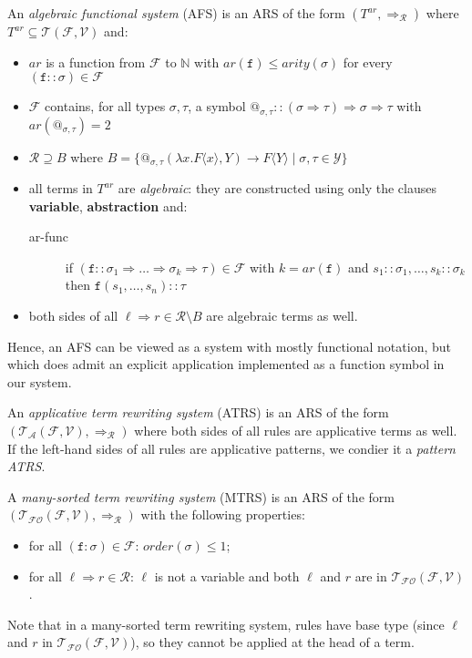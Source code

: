 \documentclass{lmcs}
\theoremstyle{theorem}\newtheorem{theorem}{Theorem}
\theoremstyle{theorem}\newtheorem{lemma}[theorem]{Lemma}
\theoremstyle{theorem}\newtheorem{corollary}[theorem]{Corollary}
\theoremstyle{definition}\newtheorem{definition}[theorem]{Definition}
\theoremstyle{definition}\newtheorem{example}[theorem]{Example}
\newcommand{\N}{\mathbb{N}}
\newcommand{\F}{\mathcal{F}}
\newcommand{\V}{\mathcal{V}}
\newcommand{\Types}{\mathcal{Y}}
\newcommand{\Terms}{\mathcal{T}}
\newcommand{\ATerms}{\mathcal{T}_{\mathcal{A}}}
\newcommand{\FOTerms}{\mathcal{T}_{\mathcal{FO}}}
\newcommand{\Rules}{\mathcal{R}}
\newcommand{\order}{\mathit{order}}
\newcommand{\atype}{\sigma}
\newcommand{\btype}{\tau}
\newcommand{\identifier}[1]{\mathtt{#1}}
\newcommand{\afun}{\identifier{f}}
\newcommand{\avar}{x}
\newcommand{\clause}[1]{\textbf{#1}}
\newcommand{\abs}[2]{\lambda #1.#2}
\newcommand{\meta}[2]{#1\langle#2\rangle}
\newcommand{\arity}{\mathit{ar}}
\newcommand{\arrtype}{\Rightarrow}
\newcommand{\arrz}{\Rightarrow}
\newcommand{\arr}[1]{\arrz_{#1}}
\begin{document}
An \emph{algebraic functional system} (AFS) is an ARS of the form $(T^\arity,\arr{\Rules})$ where
$T^\arity \subseteq \Terms(\F,\V)$ and:
\begin{itemize}
\item $\arity$ is a function from $\F$ to $\N$ with $\arity(\afun) \leq \mathit{arity}(\atype)$
  for every $(\afun :: \atype) \in \F$
\item $\F$ contains, for all types $\atype,\btype$, a symbol $@_{\atype,\btype} :: (\atype
  \arrtype \btype) \arrtype \atype \arrtype \btype$ with $\arity(@_{\atype,\btype}) = 2$
\item $\Rules \supseteq B$ where $B = \{ @_{\atype,\btype}(\abs{\avar}{\meta{F}{\avar}},Y) \to
  \meta{F}{Y} \mid \atype,\btype \in \Types \}$
\item all terms in $T^\arity$ are \emph{algebraic}: they are constructed using only the clauses
  \clause{variable}, \clause{abstraction} and:
  \begin{description}
  \item[ar-func] if $(\afun :: \atype_1 \arrtype \dots \arrtype \atype_k \arrtype \btype) \in \F$
    with $k = \arity(\afun)$ and $s_1 :: \atype_1,\dots,s_k :: \atype_k$ then $\afun(s_1,\dots,
    s_n) :: \btype$
  \end{description}
\item both sides of all $\ell \arrz r \in \Rules \setminus B$ are algebraic terms as well.
\end{itemize}
Hence, an AFS can be viewed as a system with mostly functional notation, but which does admit an
explicit application implemented as a function symbol in our system.

An \emph{applicative term rewriting system} (ATRS) is an ARS of the form $(\ATerms(\F,\V),
\arr{\Rules})$ where both sides of all rules are applicative terms as well.  If the left-hand sides
of all rules are applicative patterns, we condier it a \emph{pattern ATRS}.

A \emph{many-sorted term rewriting system} (MTRS) is an ARS of the form $(\FOTerms(\F,\V),
\arr{\Rules})$ with the following properties:
\begin{itemize}
\item for all $(\afun : \atype) \in \F$: $\order(\atype) \leq 1$;
\item for all $\ell \arrz r \in \Rules$: $\ell$ is not a variable and both $\ell$ and $r$ are in
  $\FOTerms(\F,\V)$.
\end{itemize}
Note that in a many-sorted term rewriting system, rules have base type (since $\ell$ and $r$ in
$\FOTerms(\F,\V)$), so they cannot be applied at the head of a term.
\end{document}

